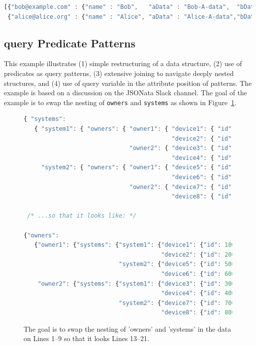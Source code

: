 \documentclass[10pt,letterpaper]{article} %
\newcommand{\stt}[1]{\texttt{#1}} %
\begin{document}
\begin{lstlisting}[language=JavaScript,basicstyle=\ttfamily\scriptsize,numbers=none]
[{"bob@example.com" : {"name" : "Bob",   "aData" : "Bob-A-data",  "bData" : "Bob-B-data"  }},
 {"alice@alice.org" : {"name" : "Alice", "aData" : "Alice-A-data","bData" : "Alice-B-data"}}].
\end{lstlisting} \vspace{-2em}

\subsection{query Predicate Patterns}

This example illustrates (1) simple restructuring of a data structure, (2) use of predicates as query patterns, (3) extensive joining
to navigate deeply nested structures, and (4) use of query variable in the attribute position of patterns.
The example is based on a discussion on the JSONata Slack channel.
The goal of the example is to swap the nesting of \stt{owners} and \stt{systems} as shown in Figure~\ref{data:restruct}.

\begin{figure}[H]
  \caption{The goal is to swap the nesting of 'owners' and 'systems' in the data on Lines 1--9
  so that it looks Lines 13--21.}
 \label{data:restruct}
\begin{lstlisting}[language=JavaScript,basicstyle=\ttfamily\scriptsize,numberstyle=\scriptsize]
{ "systems":
   { "system1": { "owners": { "owner1": { "device1": { "id": 100, "status": "Ok" },
                                          "device2": { "id": 200, "status": "Ok" }},
                              "owner2": { "device3": { "id": 300, "status": "Ok" },
                                          "device4": { "id": 400, "status": "Ok" }}}},
     "system2": { "owners": { "owner1": { "device5": { "id": 500, "status": "Ok" },
                                          "device6": { "id": 600, "status": "Ok" }},
                              "owner2": { "device7": { "id": 700, "status": "Ok" },
                                          "device8": { "id": 800, "status": "Ok" }}}}}}

 /* ...so that it looks like: */

{"owners":
   {"owner1": {"systems": {"system1": {"device1": {"id": 100, "status": "Ok"},
                                       "device2": {"id": 200, "status": "Ok"}},
                           "system2": {"device5": {"id": 500, "status": "Ok"},
                                       "device6": {"id": 600, "status": "Ok"}}},
    "owner2": {"systems": {"system1": {"device3": {"id": 300, "status": "Ok"},
                                       "device4": {"id": 400, "status": "Ok"}},
                           "system2": {"device7": {"id": 700, "status": "Ok"},
                                       "device8": {"id": 800, "status": "Ok"}}}}}))))
\end{lstlisting}
\end{figure}
\end{document}
